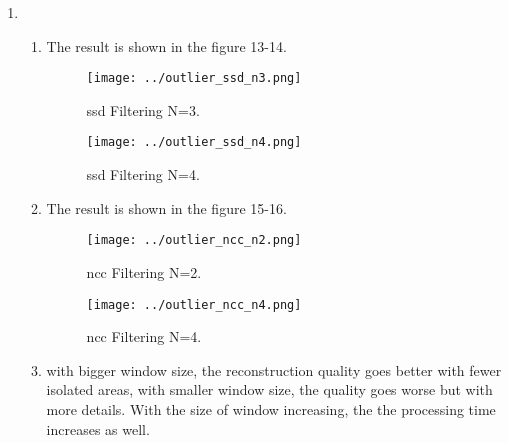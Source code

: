 \documentclass[a4paper, twoside, english]{article}
\begin{document}
\begin{enumerate}
	\item 
	\begin{enumerate}
		\item The result is shown in the figure 13-14.
		\begin{figure}
			\begin{minipage}[b]{0.45\textwidth}
				\texttt{[image: ../outlier\_ssd\_n3.png]}
				\caption{ssd Filtering N=3.}
			\end{minipage}
			\begin{minipage}[b]{0.45\textwidth}
			\texttt{[image: ../outlier\_ssd\_n4.png]}
			\caption{ssd Filtering N=4.}
			\end{minipage}
		\end{figure}
		\item The result is shown in the figure 15-16.
		\begin{figure}
		\begin{minipage}[b]{0.45\textwidth}
			\texttt{[image: ../outlier\_ncc\_n2.png]}
			\caption{ncc Filtering N=2.}
		\end{minipage}
		\begin{minipage}[b]{0.45\textwidth}
			\texttt{[image: ../outlier\_ncc\_n4.png]}
			\caption{ncc Filtering N=4.}
			\end{minipage}
		\end{figure}
		\item with bigger window size, the reconstruction quality goes better with fewer isolated areas, with smaller window size, the quality goes worse but with more details. With the size of window increasing, the the processing time increases as well.
	\end{enumerate} 
\end{enumerate}



\newpage
\end{document}

